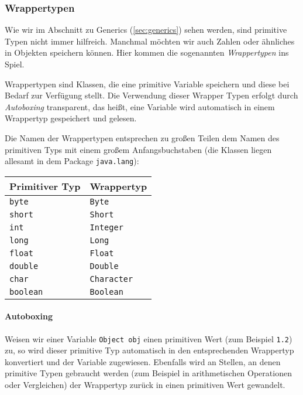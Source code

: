 	\subsubsection{Wrappertypen}
		Wie wir im Abschnitt zu Generics (\ref{sec:generics}) sehen werden, sind primitive Typen nicht immer hilfreich. Manchmal möchten wir auch Zahlen oder ähnliches in Objekten speichern können. Hier kommen die sogenannten \textit{Wrappertypen} ins Spiel.
		
		Wrappertypen sind Klassen, die eine primitive Variable speichern und diese bei Bedarf zur Verfügung stellt. Die Verwendung dieser Wrapper Typen erfolgt durch \textit{Autoboxing} transparent, das heißt, eine Variable wird automatisch in einem Wrappertyp gespeichert und gelesen.
		
		Die Namen der Wrappertypen entsprechen zu großen Teilen dem Namen des primitiven Typs mit einem großem Anfangsbuchstaben (die Klassen liegen allesamt in dem Package \lstinline|java.lang|):
		\begin{table}[H]
			\centering
			\begin{tabular}{l | l}
				\textbf{Primitiver Typ} & \textbf{Wrappertyp}   \\ \hline
				\lstinline|byte|        & \lstinline|Byte|      \\
				\lstinline|short|       & \lstinline|Short|     \\
				\lstinline|int|         & \lstinline|Integer|   \\
				\lstinline|long|        & \lstinline|Long|      \\
				\lstinline|float|       & \lstinline|Float|     \\
				\lstinline|double|      & \lstinline|Double|    \\
				\lstinline|char|        & \lstinline|Character| \\
				\lstinline|boolean|     & \lstinline|Boolean|
			\end{tabular}
		\end{table}
	
		\paragraph{Autoboxing}
			Weisen wir einer Variable \lstinline|Object obj| einen primitiven Wert (zum Beispiel \lstinline|1.2|) zu, so wird dieser primitive Typ automatisch in den entsprechenden Wrappertyp konvertiert und der Variable zugewiesen. Ebenfalls wird an Stellen, an denen primitive Typen gebraucht werden (zum Beispiel in arithmetischen Operationen oder Vergleichen) der Wrappertyp zurück in einen primitiven Wert gewandelt.
			
